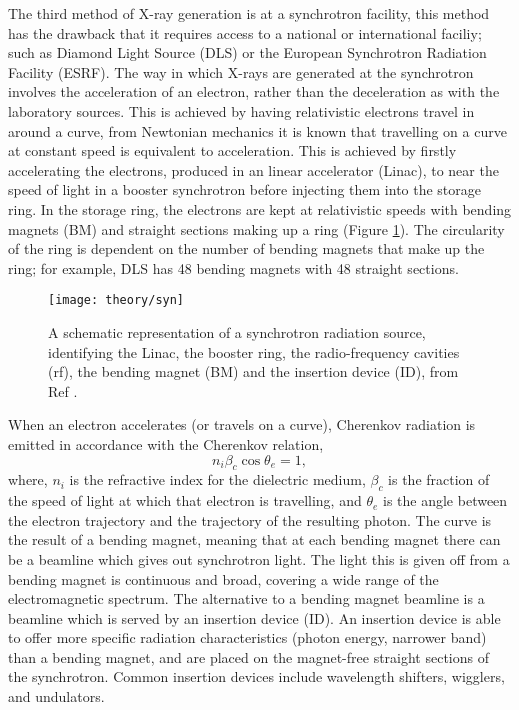 The third method of X-ray generation is at a synchrotron facility, this method has the drawback that it requires access to a national or international faciliy; such as Diamond Light Source (DLS) or the European Synchrotron Radiation Facility (ESRF). The way in which X-rays are generated at the synchrotron involves the acceleration of an electron, rather than the deceleration as with the laboratory sources. This is achieved by having relativistic electrons travel in around a curve, from Newtonian mechanics it is known that travelling on a curve at constant speed is equivalent to acceleration. This is achieved by firstly accelerating the electrons, produced in an linear accelerator (Linac), to near the speed of light in a booster synchrotron before injecting them into the storage ring. In the storage ring, the electrons are kept at relativistic speeds with bending magnets (BM) and straight sections making up a ring (Figure \ref{fig:syn}). The circularity of the ring is dependent on the number of bending magnets that make up the ring; for example, DLS has 48 bending magnets with 48 straight sections.
%
\begin{figure}
	\centering
	\texttt{[image: theory/syn]}
	\caption{A schematic representation of a synchrotron radiation source, identifying the Linac, the booster ring, the radio-frequency cavities (rf), the bending magnet (BM) and the insertion device (ID), from Ref \cite{Garcia-Gutierrez2009}.}
	\label{fig:syn}
\end{figure}
%

When an electron accelerates (or travels on a curve), Cherenkov radiation is emitted in accordance with the Cherenkov relation,
%
\begin{equation}
	n_i\beta_c\cos{\theta_e} = 1,
\end{equation}
%
where, $n_i$ is the refractive index for the dielectric medium, $\beta_c$ is the fraction of the speed of light at which that electron is travelling, and $\theta_e$ is the angle between the electron trajectory and the trajectory of the resulting photon.\cite{Garcia-Gutierrez2009} The curve is the result of a bending magnet, meaning that at each bending magnet there can be a beamline which gives out synchrotron light. The light this is given off from a bending magnet is continuous and broad, covering a wide range of the electromagnetic spectrum. The alternative to a bending magnet beamline is a beamline which is served by an insertion device (ID). An insertion device is able to offer more specific radiation characteristics (photon energy, narrower band) than a bending magnet, and are placed on the magnet-free straight sections of the synchrotron. Common insertion devices include wavelength shifters, wigglers, and undulators.

